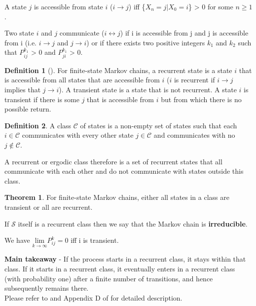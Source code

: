 \documentclass{article}
\theoremstyle{definition}
\newtheorem{definition}{Definition}[section]
\newtheorem{theorem}{Theorem}[section]
\begin{document}
A state $j$ is accessible from state $i$ ($i\rightarrow j$) iff \{$X_n=j|X_0=i$\} > 0 for some $n\geq1$.

Two state $i$ and $j$  communicate ($i\leftrightarrow j$) if i is accessible from j and j is accessible from i (i.e. $i\rightarrow j$ and $j\rightarrow i$) or if there exists two positive integers $k_1$ and $k_2$ such that $P_{ij}^{k_1}$ > 0 and $P_{ji}^{k_1}$ > 0. 
\begin{definition}[] For finite-state Markov chains, a recurrent state is a state $i$ that is
accessible from all states that are accessible from $i$ ($i$ is recurrent if $i\rightarrow j$ implies that
$j\rightarrow i$). A transient state is a state that is not recurrent. A state $i$ is transient if there is some $j$ that is accessible from $i$ but from which there is no possible return.
\end{definition}

\begin{definition}
A class $\mathcal{C}$ of states is a non-empty set of states such that each $i \in \mathcal{C}$
communicates with every other state $j \in \mathcal{C}$ and communicates with no $j \not\in \mathcal{C}$.
\end{definition}
A recurrent or ergodic class therefore is a set of recurrent states that all communicate with each other and do not communicate with states outside this class.
\begin{theorem}
For finite-state Markov chains, either all states in a class are transient or all are recurrent.

If $\mathcal{S}$ itself is a recurrent class then we say that the Markov chain is \textbf{irreducible}. 

We have $\underset{k\rightarrow\infty}{\text{lim}} P_{ij}^k=0$ iff i is transient.

\textbf{Main takeaway} - If the process starts in a recurrent class, it stays within that class. If it starts in a recurrent class, it eventually enters in a recurrent class (with probability one) after a finite number of transitions, and hence subsequently remains there.\\
Please refer to \cite{markovmit} and Appendix D of \cite{dp1} for detailed description.
\end{theorem}
\end{document}
